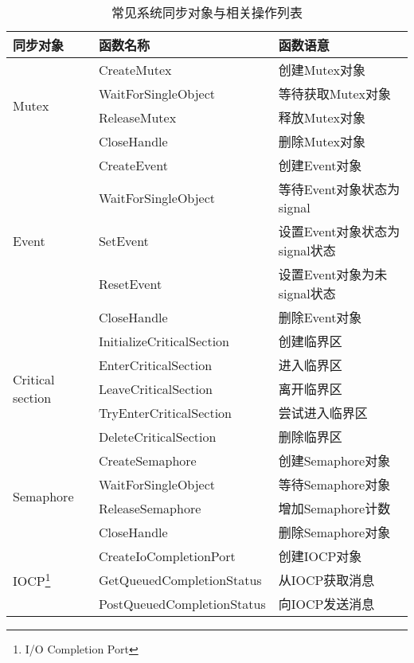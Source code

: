 \begin{table}
\centering
\begin{minipage}{0.8\linewidth}
\centering
\caption{常见系统同步对象与相关操作列表}
\label{fig:sync_func}
\begin{tabular}{lll}

\toprule[1.5pt]
同步对象 & 函数名称 & 函数语意 \\
\midrule[1pt]
\multirow{4}{*}{Mutex} & CreateMutex & 创建Mutex对象 \\
                       & WaitForSingleObject & 等待获取Mutex对象 \\
                       & ReleaseMutex & 释放Mutex对象 \\
                       & CloseHandle & 删除Mutex对象 \\
\midrule[1pt]

\multirow{5}{*}{Event} & CreateEvent & 创建Event对象 \\
                       & WaitForSingleObject & 等待Event对象状态为signal \\
                       & SetEvent & 设置Event对象状态为signal状态 \\
                       & ResetEvent & 设置Event对象为未signal状态 \\
                       & CloseHandle & 删除Event对象 \\
\midrule[1pt]

\multirow{5}{*}{Critical section} & InitializeCriticalSection & 创建临界区 \\
                                  & EnterCriticalSection & 进入临界区 \\
                                  & LeaveCriticalSection & 离开临界区 \\
                                  & TryEnterCriticalSection & 尝试进入临界区 \\
                                  & DeleteCriticalSection & 删除临界区 \\
\midrule[1pt]

\multirow{4}{*}{Semaphore} & CreateSemaphore & 创建Semaphore对象 \\
                           & WaitForSingleObject & 等待Semaphore对象 \\
                           & ReleaseSemaphore & 增加Semaphore计数 \\
                           & CloseHandle & 删除Semaphore对象 \\
\midrule[1pt]

\multirow{3}{*}{IOCP\footnote{I/O Completion Port}} & CreateIoCompletionPort & 创建IOCP对象 \\
                           & GetQueuedCompletionStatus & 从IOCP获取消息 \\
                           & PostQueuedCompletionStatus & 向IOCP发送消息\\
\midrule[1pt]


\end{tabular}
\end{minipage}
\end{table}
